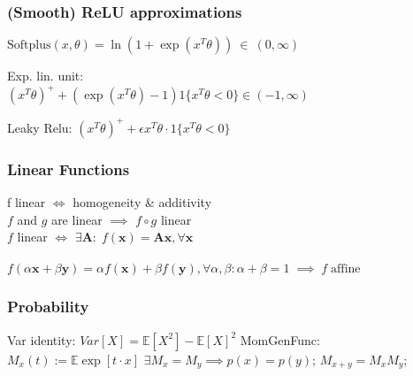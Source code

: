\subsubsection*{(Smooth) ReLU approximations}
\begin{inparaitem}[$\color{mygreen} \triangleright$]
    \item $\text{Softplus}(x,\theta) = \ln({1 + \exp({x^T \theta})})\ \in\ (0,\infty)$\\
    \item Exp. lin. unit:\\
    $(x^T \theta)^+ + (\exp(x^T \theta)-1) 1\{x^T \theta < 0\} \in (-1, \infty)$ \\
    \item Leaky Relu: $(x^T \theta)^+ + \epsilon x^T \theta\cdot 1\{x^T \theta<0\}$
\end{inparaitem}
\subsubsection*{Linear Functions}
f linear $\iff$ homogeneity \& additivity \\
$f$ and $g$ are linear $\implies$ $f \circ g$ linear \\
$f$ linear $\iff$ $\exists \mathbf{A}: \; f(\mathbf{x}) = \mathbf{A}\mathbf{x}, \forall \mathbf{x}$ \\
 \\
$f(\alpha \mathbf{x} + \beta \mathbf{y}) = \alpha f(\mathbf{x}) + \beta f(\mathbf{y}), \forall \alpha, \beta: \alpha + \beta = 1 \; \implies \; f \; \text{affine}$
\subsubsection*{Probability}
Var identity: $Var[X] = \mathbb{E}[X^2] - \mathbb{E}[X]^2$
MomGenFunc: $M_x(t):=\mathbb{E}\exp[t\cdot x]$
$\exists M_x=M_y\implies p(x)=p(y)$;
$M_{x+y}=M_x M_y$;

